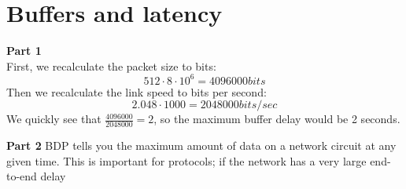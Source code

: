 \section{Buffers and latency}
\textbf{Part 1}\\
First, we recalculate the packet size to bits:
\[
512 \cdot 8 \cdot 10^6 = 4096000 bits
\]
Then we recalculate the link speed to bits per second:
\[
2.048 \cdot 1000 = 2048000 bits/sec
\]
We quickly see that $\frac{4096000}{2048000} = 2$, so the maximum buffer delay
would be 2 seconds.

\noindent \textbf{Part 2}
BDP tells you the maximum amount of data on a network circuit at any given time. This is important
for protocols; if the network has a very large end-to-end delay
